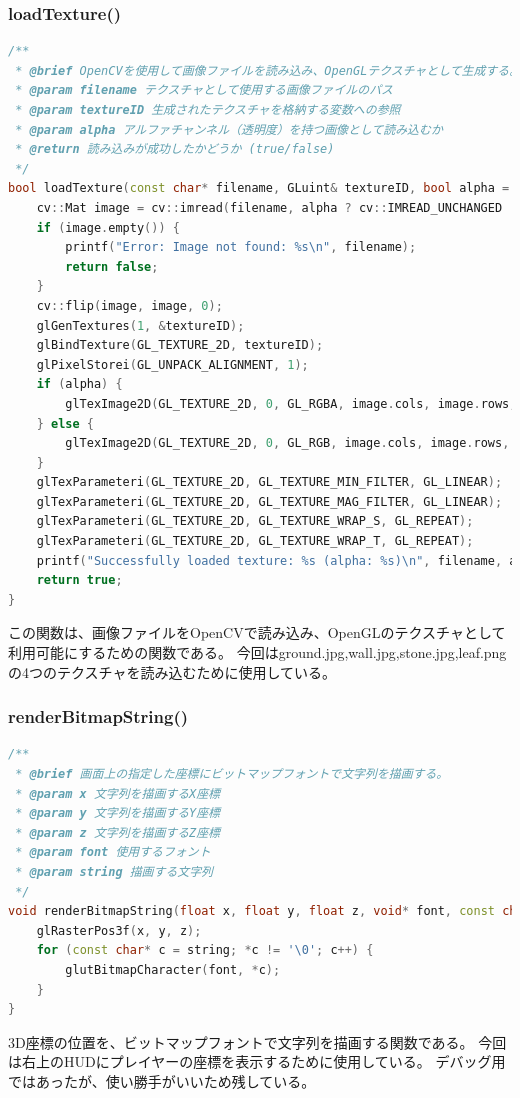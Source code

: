 \documentclass[uplatex,dvipdfmx,a4paper]{jsarticle}
\begin{document}
\hypertarget{func:loadTexture}{}\subsubsection{loadTexture()}\label{func:loadTexture}
\begin{lstlisting}[language=C++, caption={loadTexture() 関数}, label={lst:loadTexture_detail}]
/**
 * @brief OpenCVを使用して画像ファイルを読み込み、OpenGLテクスチャとして生成する。
 * @param filename テクスチャとして使用する画像ファイルのパス
 * @param textureID 生成されたテクスチャを格納する変数への参照
 * @param alpha アルファチャンネル（透明度）を持つ画像として読み込むか
 * @return 読み込みが成功したかどうか (true/false)
 */
bool loadTexture(const char* filename, GLuint& textureID, bool alpha = false) {
    cv::Mat image = cv::imread(filename, alpha ? cv::IMREAD_UNCHANGED : cv::IMREAD_COLOR);
    if (image.empty()) {
        printf("Error: Image not found: %s\n", filename);
        return false;
    }
    cv::flip(image, image, 0);
    glGenTextures(1, &textureID);
    glBindTexture(GL_TEXTURE_2D, textureID);
    glPixelStorei(GL_UNPACK_ALIGNMENT, 1);
    if (alpha) {
        glTexImage2D(GL_TEXTURE_2D, 0, GL_RGBA, image.cols, image.rows, 0, GL_BGRA, GL_UNSIGNED_BYTE, image.data);
    } else {
        glTexImage2D(GL_TEXTURE_2D, 0, GL_RGB, image.cols, image.rows, 0, GL_BGR, GL_UNSIGNED_BYTE, image.data);
    }
    glTexParameteri(GL_TEXTURE_2D, GL_TEXTURE_MIN_FILTER, GL_LINEAR);
    glTexParameteri(GL_TEXTURE_2D, GL_TEXTURE_MAG_FILTER, GL_LINEAR);
    glTexParameteri(GL_TEXTURE_2D, GL_TEXTURE_WRAP_S, GL_REPEAT);
    glTexParameteri(GL_TEXTURE_2D, GL_TEXTURE_WRAP_T, GL_REPEAT);
    printf("Successfully loaded texture: %s (alpha: %s)\n", filename, alpha ? "true" : "false");
    return true;
}
\end{lstlisting}
この関数は、画像ファイルをOpenCVで読み込み、OpenGLのテクスチャとして利用可能にするための関数である。
今回はground.jpg,wall.jpg,stone.jpg,leaf.pngの4つのテクスチャを読み込むために使用している。

\hypertarget{func:renderBitmapString}{}\subsubsection{renderBitmapString()}\label{func:renderBitmapString}
\begin{lstlisting}[language=C++, caption={renderBitmapString() 関数}, label={lst:renderBitmapString_detail}]
/**
 * @brief 画面上の指定した座標にビットマップフォントで文字列を描画する。
 * @param x 文字列を描画するX座標
 * @param y 文字列を描画するY座標
 * @param z 文字列を描画するZ座標
 * @param font 使用するフォント
 * @param string 描画する文字列
 */
void renderBitmapString(float x, float y, float z, void* font, const char* string) {
    glRasterPos3f(x, y, z);
    for (const char* c = string; *c != '\0'; c++) {
        glutBitmapCharacter(font, *c);
    }
}
\end{lstlisting}
3D座標の位置を、ビットマップフォントで文字列を描画する関数である。
今回は右上のHUDにプレイヤーの座標を表示するために使用している。
デバッグ用ではあったが、使い勝手がいいため残している。
\end{document}
